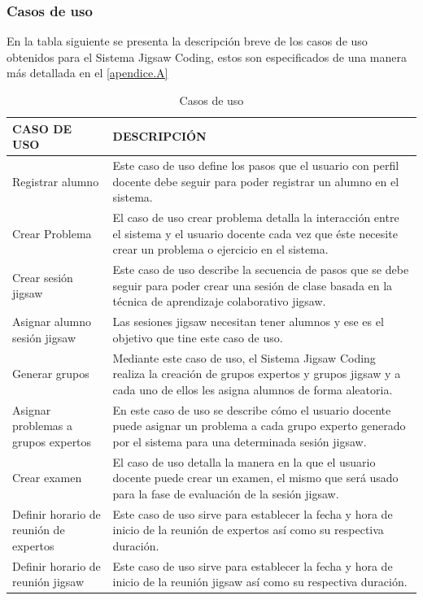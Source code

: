 \subsubsection{Casos de uso}
En la tabla siguiente se presenta la descripción breve de los casos de uso obtenidos para el Sistema Jigsaw Coding, estos son especificados de una manera más detallada en el \autoref{apendice.A}
\begin{longtable}{L{4cm}L{9cm}}
	\caption{Casos de uso}
	\label{tab:cap4_casosdeuso}\\
	\toprule[0.8mm]
	CASO DE USO & DESCRIPCIÓN \\
	\midrule[0.6mm]
	Registrar alumno & Este caso de uso define los pasos que el usuario con perfil docente debe seguir para poder registrar un alumno en el sistema.\\
	\midrule
	Crear Problema & El caso de uso crear problema detalla la interacción entre el sistema y el usuario docente cada vez que éste necesite crear un problema o ejercicio en el sistema.\\
	\midrule
	Crear sesión jigsaw & Este caso de uso describe la secuencia de pasos que se debe seguir para poder crear una sesión de clase basada en la técnica de aprendizaje colaborativo jigsaw.\\
	\midrule
	Asignar alumno sesión jigsaw & Las sesiones jigsaw necesitan tener alumnos y ese es el objetivo que tine este caso de uso.\\
	\midrule
	Generar grupos & Mediante este caso de uso, el Sistema Jigsaw Coding realiza la creación de grupos expertos y grupos jigsaw y a cada uno de ellos les asigna alumnos de forma aleatoria.\\
	\midrule
	Asignar problemas a grupos expertos & En este caso de uso se describe cómo el usuario docente puede asignar un problema a cada grupo experto generado por el sistema para una determinada sesión jigsaw.\\
	\midrule
	Crear examen & El caso de uso detalla la manera en la que el usuario docente puede crear un examen, el mismo que será usado para la fase de evaluación de la sesión jigsaw.\\
	\midrule
	Definir horario de reunión de expertos & Este caso de uso sirve para establecer la fecha y hora de inicio de la reunión de expertos así como su respectiva duración.\\
	\midrule
	Definir horario de reunión jigsaw & Este caso de uso sirve para establecer la fecha y hora de inicio de la reunión jigsaw así como su respectiva duración.\\

\end{longtable}
